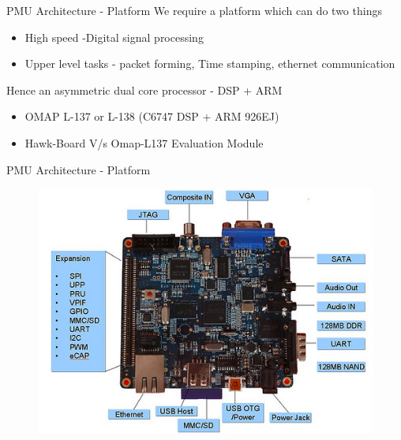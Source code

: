 \documentclass{beamer}
\begin{document}
\begin{frame}{PMU Architecture - Platform}
We require a platform which can do two things 
\begin{itemize}
\item High speed -Digital signal processing  
\item Upper level tasks - packet forming, Time stamping, ethernet communication
\end{itemize}
Hence an asymmetric dual core processor - DSP + ARM
\begin{itemize}
\item OMAP L-137 or L-138 (C6747 DSP + ARM 926EJ)
\item Hawk-Board V/s Omap-L137 Evaluation Module
\end{itemize}
\end{frame}

\begin{frame}{PMU Architecture - Platform}
\begin{figure}
\includegraphics[scale=0.8]{fig/Hawkboard_hw.jpg}
\end{figure}
\end{frame}


\end{document}
